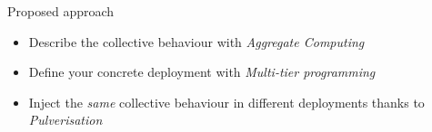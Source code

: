 \begin{frame}{Proposed approach}
  \begin{cardTiny}
    \begin{itemize}
      \item<1-> Describe the collective behaviour with {\color{accent} \textit{Aggregate Computing}~\cite{DBLP:journals/jlap/ViroliBDACP19}}
      \item<2-> Define your concrete deployment with {\color{accent} \textit{Multi-tier programming}~\cite{DBLP:journals/csur/WeisenburgerWS20}}
      \item<3-> Inject the {\color{accent} \textit{same}} collective behaviour in different deployments thanks to {\color{accent} \textit{Pulverisation}~\cite{DBLP:journals/fi/CasadeiPPVW20}}
    \end{itemize}
  \end{cardTiny}
  \begin{columns}[onlytextwidth, t]
    \begin{column}{0.27\textwidth}
      \begin{adjustbox}{max width=\textwidth, valign=m, margin=0}
      \end{adjustbox}
    \end{column}
    \begin{column}{0.32\textwidth}
      \begin{adjustbox}{max width=\textwidth, valign=m}
      \end{adjustbox}
    \end{column}
    \begin{column}{0.25\textwidth}
      \begin{adjustbox}{max width=\textwidth, valign=m}
      \end{adjustbox}
    \end{column}
  \end{columns}
\end{frame}